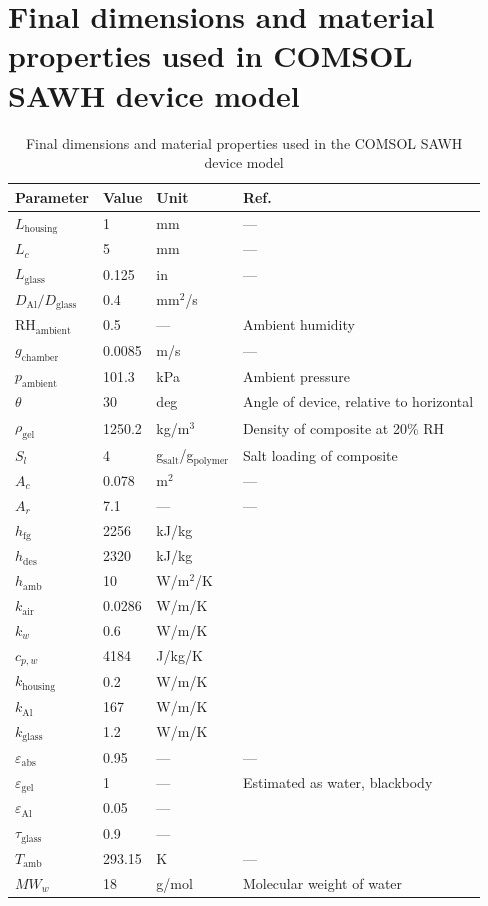\documentclass[11pt]{article}
\begin{document}
\section{Final dimensions and material properties used in COMSOL SAWH device model}

\begin{table}[h]
\centering
\caption{Final dimensions and material properties used in the COMSOL SAWH device model}
\label{tab:S3}
\begin{tabular}{llll}
\toprule
Parameter & Value & Unit & Ref. \\
\midrule
$L_{\mathrm{housing}}$ & 1 & mm & --- \\
$L_c$ & 5 & mm & --- \\
$L_{\mathrm{glass}}$ & 0.125 & in & --- \\
$D_{\mathrm{Al}}/D_{\mathrm{glass}}$ & 0.4 & mm$^2$/s & \cite{ssorensen2021} \\
RH$_{\mathrm{ambient}}$ & 0.5 & --- & Ambient humidity \\
$g_{\mathrm{chamber}}$ & 0.0085 & m/s & --- \\
$p_{\mathrm{ambient}}$ & 101.3 & kPa & Ambient pressure \\
$\theta$ & 30 & deg & Angle of device, relative to horizontal \\
$\rho_{\mathrm{gel}}$ & 1250.2 & kg/m$^3$ & Density of composite at 20\% RH \\
$S_l$ & 4 & g$_{\mathrm{salt}}$/g$_{\mathrm{polymer}}$ & Salt loading of composite \\
$A_c$ & 0.078 & m$^2$ & --- \\
$A_r$ & 7.1 & --- & --- \\
$h_{\mathrm{fg}}$ & 2256 & kJ/kg & \cite{sbell2014} \\
$h_{\mathrm{des}}$ & 2320 & kJ/kg & \cite{sdiazmarin2022} \\
$h_{\mathrm{amb}}$ & 10 & W/m$^2$/K & \cite{suba2021} \\
$k_{\mathrm{air}}$ & 0.0286 & W/m/K & \cite{sbell2014} \\
$k_w$ & 0.6 & W/m/K & \cite{sbell2014} \\
$c_{p,w}$ & 4184 & J/kg/K & \cite{sbell2014} \\
$k_{\mathrm{housing}}$ & 0.2 & W/m/K & \cite{sazo2024} \\
$k_{\mathrm{Al}}$ & 167 & W/m/K & \cite{sazo2024} \\
$k_{\mathrm{glass}}$ & 1.2 & W/m/K & \cite{ssorensen2021} \\
$\varepsilon_{\mathrm{abs}}$ & 0.95 & --- & --- \\
$\varepsilon_{\mathrm{gel}}$ & 1 & --- & Estimated as water, blackbody \\
$\varepsilon_{\mathrm{Al}}$ & 0.05 & --- & \cite{skaviany2011} \\
$\tau_{\mathrm{glass}}$ & 0.9 & --- & \cite{sbassarab2023} \\
$T_{\mathrm{amb}}$ & 293.15 & K & --- \\
$MW_w$ & 18 & g/mol & Molecular weight of water \\
\bottomrule
\end{tabular}
\end{table}
\end{document}

